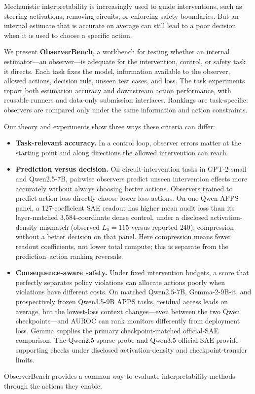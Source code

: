 Mechanistic interpretability is increasingly used to guide interventions, such
as steering activations, removing circuits, or enforcing safety boundaries.
But an internal estimate that is accurate on average can still lead to a poor
decision when it is used to choose a specific action.

We present \textbf{ObserverBench}, a workbench for testing whether
an internal estimator---an observer---is adequate for the intervention,
control, or safety task it directs. Each task fixes the model, information
available to the observer, allowed actions, decision rule, unseen test cases,
and loss. The task experiments report both estimation accuracy and downstream
action performance, with reusable runners and data-only submission interfaces.
Rankings are task-specific: observers are compared only
under the same information and action constraints.

Our theory and experiments show three ways these criteria can differ:

\begin{itemize}[leftmargin=1.4em,itemsep=0.15em,topsep=0.25em]
  \item \textbf{Task-relevant accuracy.} In a control loop, observer errors
  matter at the starting point and along directions the allowed intervention
  can reach.

  \item \textbf{Prediction versus decision.} On circuit-intervention tasks in
  GPT-2-small and Qwen2.5-7B, pairwise observers predict unseen intervention
  effects more accurately without always choosing better actions. Observers
  trained to predict action loss directly choose lower-loss actions. On one
  Qwen APPS panel, a 127-coefficient SAE readout has higher mean audit loss
  than its layer-matched 3,584-coordinate dense control, under a disclosed
  activation-density mismatch (observed $L_0=115$ versus reported $240$):
  compression without a better decision on that panel. Here compression means
  fewer readout coefficients, not lower total compute; this is separate from
  the prediction--action ranking reversals.

  \item \textbf{Consequence-aware safety.} Under fixed intervention budgets,
  a score that perfectly separates policy violations can allocate actions
  poorly when violations have different costs. On matched Qwen2.5-7B,
  Gemma-2-9B-it, and prospectively frozen Qwen3.5-9B APPS tasks, residual access
  leads on average, but the lowest-loss context changes---even between the two
  Qwen checkpoints---and AUROC can rank monitors differently from deployment
  loss. Gemma supplies the primary checkpoint-matched official-SAE comparison.
  The Qwen2.5 sparse probe and Qwen3.5 official SAE provide supporting checks
  under disclosed activation-density and checkpoint-transfer limits.
\end{itemize}

ObserverBench provides a common way to evaluate interpretability methods
through the actions they enable.
